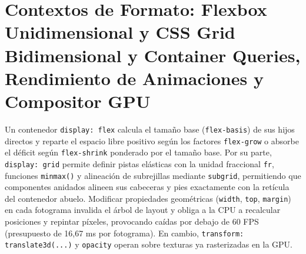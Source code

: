 \documentclass{book}
\begin{document}
\section{Contextos de Formato: Flexbox Unidimensional y CSS Grid Bidimensional y Container Queries, Rendimiento de Animaciones y Compositor GPU}

Un contenedor \texttt{display: flex} calcula el tamaño base (\texttt{flex-basis}) de sus hijos directos y reparte el espacio libre positivo según los factores \texttt{flex-grow} o absorbe el déficit según \texttt{flex-shrink} ponderado por el tamaño base. Por su parte, \texttt{display: grid} permite definir pistas elásticas con la unidad fraccional \texttt{fr}, funciones \texttt{minmax()} y alineación de subrejillas mediante \texttt{subgrid}, permitiendo que componentes anidados alineen sus cabeceras y pies exactamente con la retícula del contenedor abuelo.
Modificar propiedades geométricas (\texttt{width}, \texttt{top}, \texttt{margin}) en cada fotograma invalida el árbol de layout y obliga a la CPU a recalcular posiciones y repintar píxeles, provocando caídas por debajo de 60 FPS (presupuesto de 16,67 ms por fotograma). En cambio, \texttt{transform: translate3d(...)} y \texttt{opacity} operan sobre texturas ya rasterizadas en la GPU.
\end{document}
